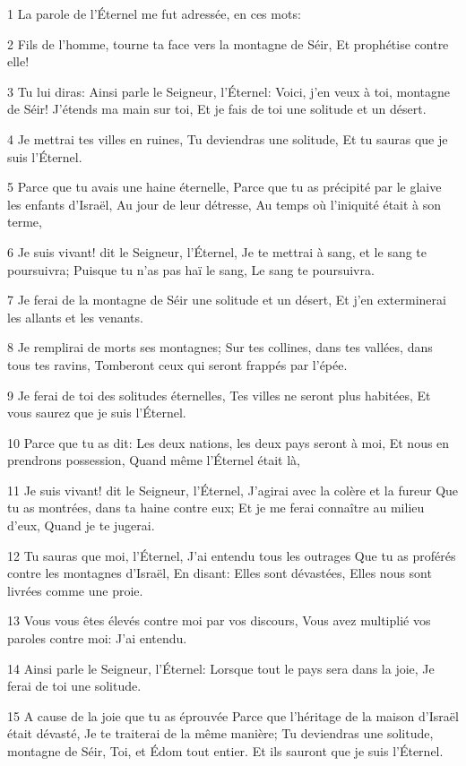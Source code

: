 \par 1 La parole de l'Éternel me fut adressée, en ces mots:
\par 2 Fils de l'homme, tourne ta face vers la montagne de Séir, Et prophétise contre elle!
\par 3 Tu lui diras: Ainsi parle le Seigneur, l'Éternel: Voici, j'en veux à toi, montagne de Séir! J'étends ma main sur toi, Et je fais de toi une solitude et un désert.
\par 4 Je mettrai tes villes en ruines, Tu deviendras une solitude, Et tu sauras que je suis l'Éternel.
\par 5 Parce que tu avais une haine éternelle, Parce que tu as précipité par le glaive les enfants d'Israël, Au jour de leur détresse, Au temps où l'iniquité était à son terme,
\par 6 Je suis vivant! dit le Seigneur, l'Éternel, Je te mettrai à sang, et le sang te poursuivra; Puisque tu n'as pas haï le sang, Le sang te poursuivra.
\par 7 Je ferai de la montagne de Séir une solitude et un désert, Et j'en exterminerai les allants et les venants.
\par 8 Je remplirai de morts ses montagnes; Sur tes collines, dans tes vallées, dans tous tes ravins, Tomberont ceux qui seront frappés par l'épée.
\par 9 Je ferai de toi des solitudes éternelles, Tes villes ne seront plus habitées, Et vous saurez que je suis l'Éternel.
\par 10 Parce que tu as dit: Les deux nations, les deux pays seront à moi, Et nous en prendrons possession, Quand même l'Éternel était là,
\par 11 Je suis vivant! dit le Seigneur, l'Éternel, J'agirai avec la colère et la fureur Que tu as montrées, dans ta haine contre eux; Et je me ferai connaître au milieu d'eux, Quand je te jugerai.
\par 12 Tu sauras que moi, l'Éternel, J'ai entendu tous les outrages Que tu as proférés contre les montagnes d'Israël, En disant: Elles sont dévastées, Elles nous sont livrées comme une proie.
\par 13 Vous vous êtes élevés contre moi par vos discours, Vous avez multiplié vos paroles contre moi: J'ai entendu.
\par 14 Ainsi parle le Seigneur, l'Éternel: Lorsque tout le pays sera dans la joie, Je ferai de toi une solitude.
\par 15 A cause de la joie que tu as éprouvée Parce que l'héritage de la maison d'Israël était dévasté, Je te traiterai de la même manière; Tu deviendras une solitude, montagne de Séir, Toi, et Édom tout entier. Et ils sauront que je suis l'Éternel.

